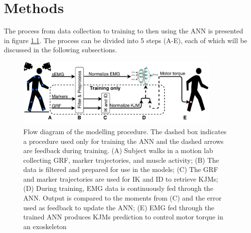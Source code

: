 \documentclass[../main.tex]{subfiles}
\begin{document}
\chapter{Methods}
\label{sec:methods}
The process from data collection to training to then using the \ac{ANN} is presented in figure \ref{fig:process-diagram}. 
The process can be divided into 5 steps (A-E), each of which will be discussed in the following subsections.
\begin{figure}[ht]
    \centering
    \includegraphics[width=0.9\textwidth]{img/ProcessDiagram}
    \caption{Flow diagram of the modelling procedure. The dashed box indicates a procedure used only for training the \ac{ANN} and the dashed arrows are feedback during training. (A) Subject walks in a motion lab collecting \acf{GRF}, marker trajectories, and muscle activity; (B) The data is filtered and prepared for use in the models; (C) The \ac{GRF} and marker trajectories are used for \ac{IK} and \ac{ID} to retrieve \acp{KJM}; (D) During training, \ac{EMG} data is continuously fed through the \ac{ANN}. Output is compared to the moments from (C) and the error used as feedback to update the \ac{ANN}; (E) \ac{EMG} fed through the trained \ac{ANN} produces \acp{KJM} prediction to control motor torque in an exoskeleton}
    \label{fig:process-diagram}
\end{figure}
\end{document}
